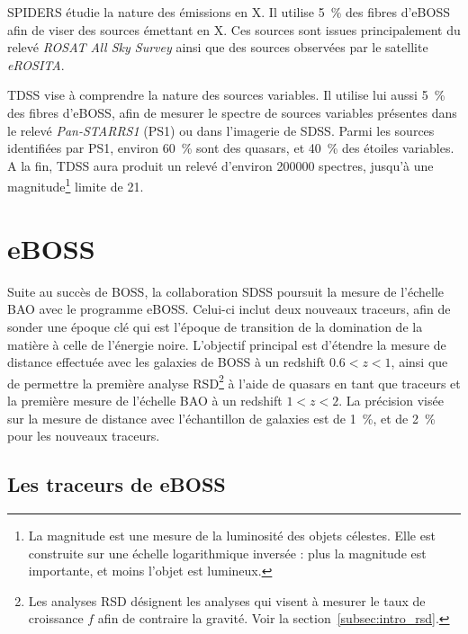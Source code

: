 \begin{itemize}
  SPIDERS étudie la nature des émissions en X. Il utilise \SI{5}{\percent} des fibres d'eBOSS afin de viser des sources émettant en X. Ces sources sont issues principalement du relevé \emph{ROSAT All Sky Survey} ainsi que des sources observées par le satellite \emph{eROSITA}.

  TDSS vise à comprendre la nature des sources variables. Il utilise lui aussi \SI{5}{\percent} des fibres d'eBOSS, afin de mesurer le spectre de sources variables présentes dans le relevé \emph{Pan-STARRS1} (PS1) ou dans l'imagerie de SDSS. Parmi les sources identifiées par PS1, environ \SI{60}{\percent} sont des quasars, et \SI{40}{\percent} des étoiles variables. A la fin, TDSS aura produit un relevé d'environ \num{200000} spectres, jusqu'à une magnitude\footnote{La magnitude est une mesure de la luminosité des objets célestes. Elle est construite sur une échelle logarithmique inversée : plus la magnitude est importante, et moins l'objet est lumineux.} limite de 21.
\end{itemize}



\section{eBOSS}

Suite au succès de BOSS, la collaboration SDSS poursuit la mesure de l'échelle BAO avec le programme eBOSS. Celui-ci inclut deux nouveaux traceurs, afin de sonder une époque clé qui est l'époque de transition de la domination de la matière à celle de l'énergie noire.
L'objectif principal est d'étendre la mesure de distance effectuée avec les galaxies de BOSS à un redshift $\num{0,6} < z < \num{1}$, ainsi que de permettre la première analyse RSD\footnote{Les analyses RSD désignent les analyses qui visent à mesurer le taux de croissance $f$ afin de contraire la gravité. Voir la section~\ref{subsec:intro_rsd}.} à l'aide de quasars en tant que traceurs et la première mesure de l'échelle BAO à un redshift $1 < z < 2$.
La précision visée sur la mesure de distance avec l'échantillon de galaxies est de \SI{1}{\percent}, et de \SI{2}{\percent} pour les nouveaux traceurs.



\subsection{Les traceurs de eBOSS}

